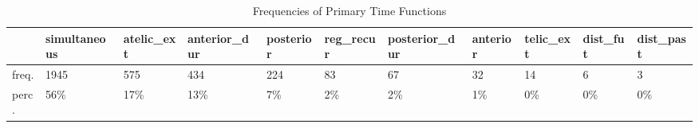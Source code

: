 \begin{table}[htbp!]
\centering
\caption{Frequencies of Primary Time Functions}
\label{table:funct_counts}
\begin{adjustbox}{width=1\textwidth}
\begin{tabular}{lllllllllll}
\toprule
{} & simultaneous & atelic\_ext & anterior\_dur & posterior & reg\_recur & posterior\_dur & anterior & telic\_ext & dist\_fut & dist\_past \\
\midrule
freq. &         1945 &        575 &          434 &       224 &        83 &            67 &       32 &        14 &        6 &         3 \\
perc. &          56\% &        17\% &          13\% &        7\% &        2\% &            2\% &       1\% &        0\% &       0\% &        0\% \\
\bottomrule
\end{tabular}
\end{adjustbox}
\end{table}
